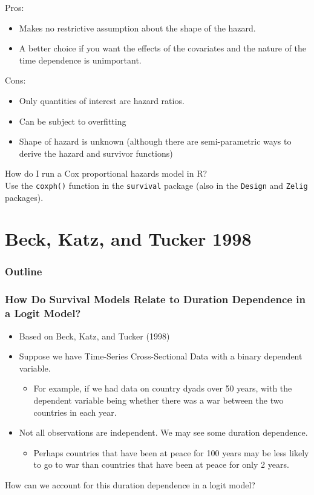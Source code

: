 \documentclass[handout]{beamer}
\begin{document}
\begin{frame}
Pros:
\pause
\begin{itemize}
\item Makes no restrictive assumption about the shape of the hazard.
\pause
\item A better choice if you want the effects of the covariates and
the nature of the time dependence is unimportant.
\end{itemize}
\pause
Cons:
\pause
\begin{itemize}
\item Only quantities of interest are hazard ratios.
\pause
\item Can be subject to overfitting
\pause
\item Shape of hazard is unknown (although there are semi-parametric
ways to derive the hazard and survivor functions)
\end{itemize}

\end{frame}

\begin{frame}
How do I run a Cox proportional hazards model in R?\\
\pause
\bigskip
Use the {\tt coxph()} function in the {\tt survival} package (also in
the {\tt Design} and {\tt Zelig} packages).
\end{frame}

\section{Beck, Katz, and Tucker 1998}

\begin{frame}
\frametitle{Outline}
\tableofcontents[currentsection]
\end{frame}

\begin{frame}
\frametitle{How Do Survival Models Relate to Duration Dependence in a
Logit Model?}
\pause
\begin{itemize}
\item Based on Beck, Katz, and Tucker (1998)
\pause
\item Suppose we have Time-Series Cross-Sectional Data with a binary
dependent variable.
\pause
\begin{itemize}
\item For example, if we had data on country dyads over 50 years, with
the dependent variable being whether there was a war between the two
countries in each year.
\end{itemize} 
\pause
\item Not all observations are independent. We may see some duration dependence.
\pause
\begin{itemize}
\item Perhaps countries that have been at peace for 100 years may be
less likely to go to war than countries that have been at peace for
only 2 years.
\end{itemize} 
\end{itemize}
\pause
\bigskip
How can we account for this duration dependence in a logit model?
\end{frame}
\end{document}
